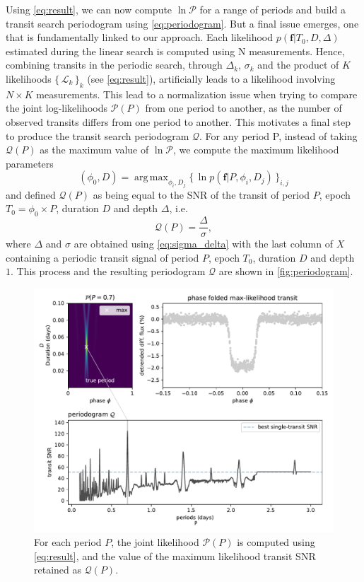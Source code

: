 \documentclass[modern]{aastex631}
\newcommand{\set}[1]{\{\,#1\,\}}
\DeclareMathOperator*{\argmax}{arg\,max}
\begin{document}
Using \autoref{eq:result}, we can now compute $\ln\mathcal{P}$ for a range of periods and build a transit search periodogram using \autoref{eq:periodogram}. But a final issue emerges, one that is fundamentally linked to our approach. Each likelihood $p(\bm{f} \vert T_0, D, \Delta)$ estimated during the linear search is computed using N measurements. Hence, combining transits in the periodic search, through $\Delta_k$, $\sigma_k$ and the product of $K$ likelihoods $\set{\mathcal{L}_k}_k$ (see \autoref{eq:result}), artificially leads to a likelihood involving $N\times K$ measurements. This lead to a normalization issue when trying to compare the joint log-likelihoods $\mathcal{P}(P)$ from one period to another, as the number of observed transits differs from one period to another. This motivates a final step to produce the transit search periodogram $\mathcal{Q}$. For any period P, instead of taking $ \mathcal{Q}(P)$ as the maximum value of $\ln\mathcal{P}$, we compute the maximum likelihood parameters
\begin{equation}\label{eq:phi0}
    (\phi_0 ,D) = \argmax_{\phi_i, D_j} \set{\ln p(\bm{f} \vert P, \phi_i, D_j)}_{i, j}
\end{equation}
and defined $\mathcal{Q}(P)$ as being equal to the SNR of the transit of period $P$, epoch $T_0 = \phi_0 \times P$, duration $D$ and depth $\Delta$, i.e.
\begin{equation*}
    \mathcal{Q}(P) = \frac{\Delta}{\sigma},
\end{equation*}
where $\Delta$ and $\sigma$ are obtained using \autoref{eq:sigma_delta} with the last column of $X$ containing a periodic transit signal of period $P$, epoch $T_0$, duration $D$ and depth $1$. This process and the resulting periodogram $\mathcal{Q}$ are shown in \autoref{fig:periodogram}.
\begin{figure}[H]
    \begin{centering}
        \includegraphics[width=\linewidth]{../workflows/principle/figures/principle_Q.pdf}
        \caption{For each period $P$, the joint likelihood $\mathcal{P}(P)$ is computed using \autoref{eq:result}, and the value of the maximum likelihood transit SNR retained as $\mathcal{Q}(P)$.}
        \label{fig:periodogram}
    \end{centering}
\end{figure}
\end{document}
